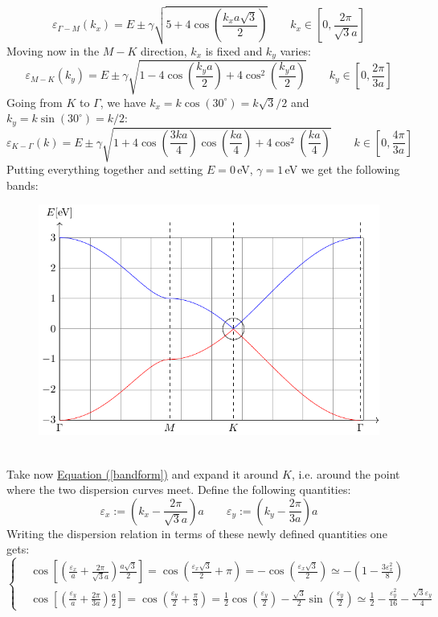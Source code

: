 \documentclass[10.75pt,a4paper,openright,bottom=2cm]{article}
\renewcommand{\refeq}[1]{\hyperref[#1]{Equation (\ref{#1})}}
\begin{document}
\[
\varepsilon_{\Gamma-M}(k_x)=E\pm\gamma\sqrt{5+4\cos\left(\frac{k_xa\sqrt{3}}{2}\right)} \qquad k_x\in\left[0,\frac{2\pi}{\sqrt{3}a}\right]
\]
Moving now in the $M-K$ direction, $k_x$ is fixed and $k_y$ varies:
\[
\varepsilon_{M-K}(k_y)=E\pm\gamma\sqrt{1-4\cos\left(\frac{k_ya}{2}\right)+4\cos^2\left(\frac{k_ya}{2}\right)} \qquad k_y\in\left[0,\frac{2\pi}{3a}\right]
\]
Going from $K$ to $\Gamma$, we have $k_x=k\cos(30^\circ)=k\sqrt{3}/2$ and $k_y=k\sin(30^\circ)=k/2$:
\[
\varepsilon_{K-\Gamma}(k)=E\pm\gamma\sqrt{1+4\cos\left(\frac{3ka}{4}\right)\cos\left(\frac{ka}{4}\right)+4\cos^2\left(\frac{ka}{4}\right)} \qquad k\in\left[0,\frac{4\pi}{3a}\right]
\]
Putting everything together and setting $E=0$\,eV, $\gamma=1$\,eV we get the following bands:
\begin{figure}[h]
    \centering
    \includegraphics{graphenebands.pdf}
    \label{fig:graphenebands}
\end{figure}\\
\noindent
Take now \refeq{bandform} and expand it around $K$, i.e. around the point where the two dispersion curves meet.
Define the following quantities:
\[
\varepsilon_x:=\left(k_x-\frac{2\pi}{\sqrt{3}a}\right)a \qquad \varepsilon_y:=\left(k_y-\frac{2\pi}{3a}\right)a
\]
Writing the dispersion relation in terms of these newly defined quantities one gets:
\[
\left\{
\begin{aligned}
&\cos\left[\left(\frac{\varepsilon_x}{a}+\frac{2\pi}{\sqrt{3}a}\right)\frac{a\sqrt{3}}{2}\right]=\cos\left(\frac{\varepsilon_x\sqrt{3}}{2}+\pi\right)=-\cos\left(\frac{\varepsilon_x\sqrt{3}}{2}\right)\simeq-\left(1-\frac{3\varepsilon_x^2}{8}\right)\\
&\cos\left[\left(\frac{\varepsilon_y}{a}+\frac{2\pi}{3a}\right)\frac{a}{2}\right]=\cos\left(\frac{\varepsilon_y}{2}+\frac{\pi}{3}\right)=\frac{1}{2}\cos\left(\frac{\varepsilon_y}{2}\right)-\frac{\sqrt{3}}{2}\sin\left(\frac{\varepsilon_y}{2}\right)\simeq\frac{1}{2}-\frac{\varepsilon_y^2}{16}-\frac{\sqrt{3}\varepsilon_y}{4}
\end{aligned}
\right.
\]
\end{document}
